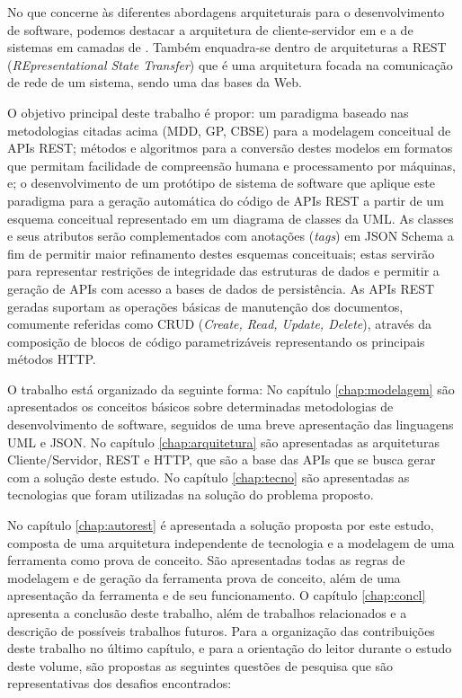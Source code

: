 No que concerne às diferentes abordagens arquiteturais para o desenvolvimento de software, podemos destacar a arquitetura de cliente-servidor em  e a de sistemas em camadas de . Também enquadra-se dentro de arquiteturas a REST (\textit{REpresentational State Transfer}) \cite{FIELDING:2000} que é uma arquitetura focada na comunicação de rede de um sistema, sendo uma das bases da Web.

O objetivo principal deste trabalho é propor: um paradigma baseado nas metodologias citadas acima (MDD, GP, CBSE) para a modelagem conceitual de APIs REST; métodos e algoritmos para a conversão destes modelos em formatos que permitam facilidade de compreensão humana e processamento por máquinas, e; o desenvolvimento de um protótipo de sistema de software que aplique este paradigma para a geração automática do código de APIs REST a partir de um esquema conceitual representado em um diagrama de classes da UML. As classes e seus atributos serão complementados com anotações (\emph{tags}) em JSON Schema a fim de permitir maior refinamento destes esquemas conceituais; estas servirão para representar restrições de integridade das estruturas de dados e permitir a geração de APIs com acesso a bases de dados de persistência. As APIs REST geradas suportam as operações básicas de manutenção dos documentos, comumente referidas como CRUD (\textit{Create, Read, Update, Delete}), através da composição de blocos de código parametrizáveis representando os principais métodos HTTP.

O trabalho está organizado da seguinte forma: No capítulo \ref{chap:modelagem} são apresentados os conceitos básicos sobre determinadas metodologias de desenvolvimento de software, seguidos de uma breve apresentação das linguagens UML e JSON. No capítulo \ref{chap:arquitetura} são apresentadas as arquiteturas Cliente/Servidor, REST e HTTP, que são a base das APIs que se busca gerar com a solução deste estudo. No capítulo \ref{chap:tecno} são apresentadas as tecnologias que foram utilizadas na solução do problema proposto.

No capítulo \ref{chap:autorest} é apresentada a solução proposta por este estudo, composta de uma arquitetura independente de tecnologia e a modelagem de uma ferramenta como prova de conceito. São apresentadas todas as regras de modelagem e de geração da ferramenta prova de conceito, além de uma apresentação da ferramenta e de seu funcionamento. O capítulo \ref{chap:concl} apresenta a conclusão deste trabalho, além de trabalhos relacionados e a descrição de possíveis trabalhos futuros. Para a organização das contribuições deste trabalho no último capítulo, e para a orientação do leitor durante o estudo deste volume, são propostas as seguintes questões de pesquisa que são representativas dos desafios encontrados:


